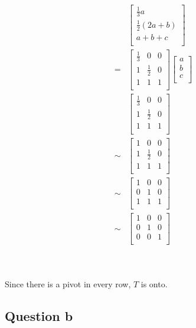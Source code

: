 \documentclass{article}
\begin{document}
\begin{equation*}
\begin{split}
&\begin{bmatrix}
\frac{1}{3}a\\
\frac{1}{2}(2a+b)\\
a+b+c\\
\end{bmatrix}\\
=&\begin{bmatrix}
\frac{1}{3}&0&0\\
1&\frac{1}{2}&0\\
1&1&1\\
\end{bmatrix}\begin{bmatrix}
a\\
b\\
c\\
\end{bmatrix}\\
&\begin{bmatrix}
\frac{1}{3}&0&0\\
1&\frac{1}{2}&0\\
1&1&1\\
\end{bmatrix}\\
\sim & \begin{bmatrix}
1&0&0\\
1&\frac{1}{2}&0\\
1&1&1\\
\end{bmatrix}\\
\sim &\begin{bmatrix}
1&0&0\\
0&1&0\\
1&1&1\\
\end{bmatrix}\\
\sim &\begin{bmatrix}
1&0&0\\
0&1&0\\
0&0&1\\
\end{bmatrix}\\
\end{split}
\end{equation*}

~

Since there is a pivot in every row, $T$ is onto.

\subsection{Question b}
\end{document}
